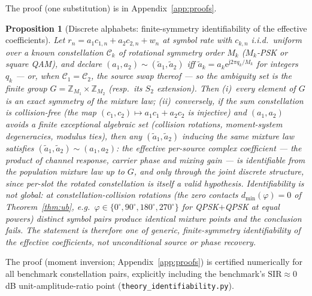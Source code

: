 \documentclass[journal]{IEEEtran}
\newcommand{\sir}{\mathrm{SIR}}
\newcommand{\ee}{\mathrm{e}}
\newcommand{\jj}{\mathrm{j}}
\newcommand{\const}{\mathcal{C}}
\newtheorem{proposition}{Proposition}
\begin{document}
The proof (one substitution) is in Appendix~\ref{app:proofs}.

\begin{proposition}[Discrete alphabets: finite-symmetry identifiability
of the effective coefficients]
\label{prop:discrete}
Let $r_n = a_1 c_{1,n} + a_2 c_{2,n} + w_n$ at symbol rate with $c_{k,n}$
i.i.d.\ uniform over a known constellation $\const_k$ of rotational
symmetry order $M_k$ ($M_k$-PSK or square QAM), and declare
$(a_1, a_2) \sim (\tilde a_1, \tilde a_2)$ iff $\tilde a_k = a_k
\ee^{\jj 2\pi q_k / M_k}$ for integers $q_k$ --- or, when $\const_1 =
\const_2$, the source swap thereof --- so the ambiguity set is the
finite group $G = \mathbb{Z}_{M_1} \times \mathbb{Z}_{M_2}$ (resp.\ its
$S_2$ extension). Then (i)~every element of $G$ is an exact symmetry of
the mixture law; (ii)~conversely, if the sum constellation is
collision-free (the map $(c_1, c_2) \mapsto a_1 c_1 + a_2 c_2$ is
injective) and $(a_1, a_2)$ avoids a finite exceptional algebraic set
(collision rotations, moment-system degeneracies, modulus ties), then
any $(\tilde a_1, \tilde a_2)$ inducing the same mixture law satisfies
$(\tilde a_1, \tilde a_2) \sim (a_1, a_2)$: the \emph{effective
per-source complex coefficient} --- the product of channel response,
carrier phase and mixing gain --- is identifiable from the population
mixture law up to $G$, and only through the \emph{joint} discrete
structure, since
per-slot the rotated constellation is itself a valid hypothesis.
Identifiability is \emph{not} global: at constellation-collision
rotations (the zero contacts $d_{\min}(\varphi) = 0$ of
Theorem~\ref{thm:ub}, e.g.\ $\varphi \in \{0^\circ, 90^\circ,
180^\circ, 270^\circ\}$ for QPSK$+$QPSK at equal powers) distinct
symbol pairs produce identical mixture points and the conclusion fails.
The statement is therefore one of generic, finite-symmetry
identifiability of the effective coefficients, not unconditional source
or phase recovery.
\end{proposition}

The proof (moment inversion; Appendix~\ref{app:proofs}) is certified
numerically for all benchmark constellation pairs, explicitly including
the benchmark's $\sir \approx 0$\,dB unit-amplitude-ratio point
(\texttt{theory\_identifiability.py}).
\end{document}
